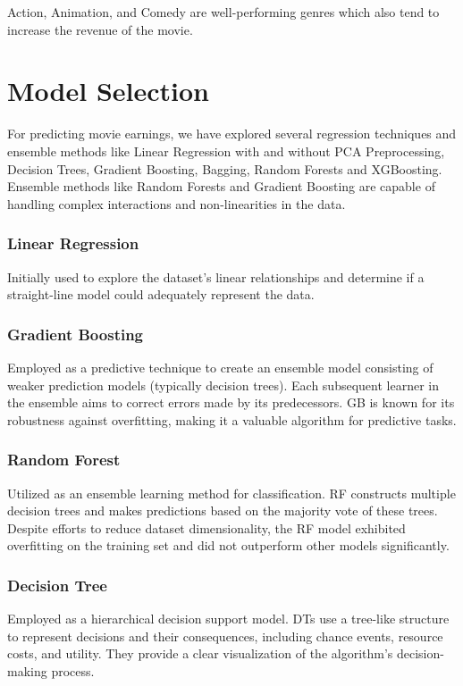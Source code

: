 \documentclass[conference]{IEEEtran}
\begin{document}
            Action, Animation, and Comedy are well-performing genres which also tend to increase the revenue of the movie.

\section{Model Selection}
    For predicting movie earnings, we have explored several regression techniques and ensemble methods like Linear Regression with and without PCA Preprocessing, Decision Trees, Gradient Boosting, Bagging, Random Forests and XGBoosting.
    Ensemble methods like Random Forests and Gradient Boosting are capable of handling complex interactions and non-linearities in the data.
    
    \subsubsection{Linear Regression}
        Initially used to explore the dataset's linear relationships and determine if a straight-line model could adequately represent the data.
    
    \subsubsection{Gradient Boosting}
        Employed as a predictive technique to create an ensemble model consisting of weaker prediction models (typically decision trees). Each subsequent learner in the ensemble aims to correct errors made by its predecessors. GB is known for its robustness against overfitting, making it a valuable algorithm for predictive tasks.
    
    \subsubsection{Random Forest}
        Utilized as an ensemble learning method for classification. RF constructs multiple decision trees and makes predictions based on the majority vote of these trees. Despite efforts to reduce dataset dimensionality, the RF model exhibited overfitting on the training set and did not outperform other models significantly.
    
    \subsubsection{Decision Tree}
        Employed as a hierarchical decision support model. DTs use a tree-like structure to represent decisions and their consequences, including chance events, resource costs, and utility. They provide a clear visualization of the algorithm's decision-making process.
    
\end{document}
